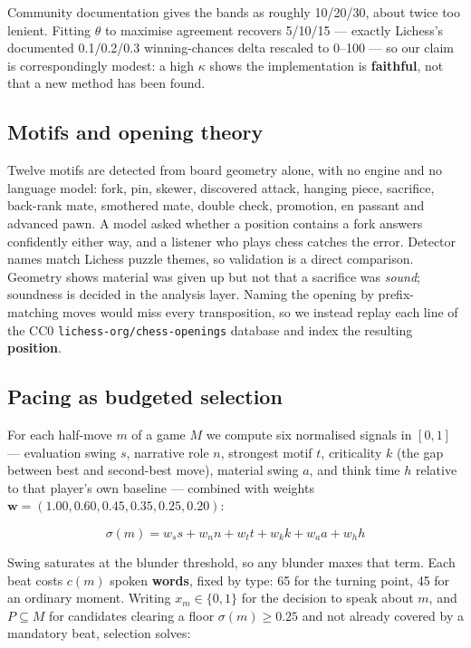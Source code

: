 \documentclass[conference]{IEEEtran}
\begin{document}
Community documentation gives the bands as roughly 10/20/30, about twice too
lenient. Fitting $\theta$ to maximise agreement recovers 5/10/15 --- exactly
Lichess's documented 0.1/0.2/0.3 winning-chances delta rescaled to 0--100
--- so our claim is correspondingly modest: a high $\kappa$ shows the
implementation is \textbf{faithful}, not that a new method has been found.

\subsection{Motifs and opening theory}

Twelve motifs are detected from board geometry alone, with no engine and no
language model: fork, pin, skewer, discovered attack, hanging piece,
sacrifice, back-rank mate, smothered mate, double check, promotion, en
passant and advanced pawn. A model asked whether a position contains a fork
answers confidently either way, and a listener who plays chess catches the
error. Detector names match Lichess puzzle themes, so validation is a direct
comparison. Geometry shows material was given up but not that a sacrifice
was \emph{sound}; soundness is decided in the analysis layer. Naming the
opening by prefix-matching moves would miss every transposition, so we
instead replay each line of the CC0 \texttt{lichess-org/chess-openings}
database and index the resulting \textbf{position}.

\subsection{Pacing as budgeted selection}
\label{sec:pacing}

For each half-move $m$ of a game $M$ we compute six normalised signals in
$[0,1]$ --- evaluation swing $s$, narrative role $n$, strongest motif $t$,
criticality $k$ (the gap between best and second-best move), material swing
$a$, and think time $h$ relative to that player's own baseline --- combined
with weights $\mathbf{w} = (1.00, 0.60, 0.45, 0.35, 0.25, 0.20)$:

\begin{equation}
\sigma(m) = w_s s + w_n n + w_t t + w_k k + w_a a + w_h h
\end{equation}

Swing saturates at the blunder threshold, so any blunder maxes that term.
Each beat costs $c(m)$ spoken \textbf{words}, fixed by type: 65 for the
turning point, 45 for an ordinary moment. Writing $x_m \in \{0,1\}$ for the
decision to speak about $m$, and $P \subseteq M$ for candidates clearing a
floor $\sigma(m) \geq 0.25$ and not already covered by a mandatory beat,
selection solves:
\end{document}
